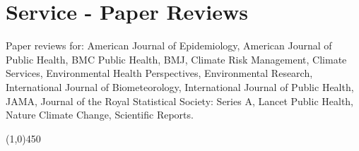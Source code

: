 \section*{Service - Paper Reviews}

\noindent Paper reviews for: American Journal of Epidemiology, American Journal of Public Health, BMC Public Health, BMJ, Climate Risk Management, Climate Services, Environmental Health Perspectives, Environmental Research, International Journal of Biometeorology, International Journal of Public Health, JAMA, Journal of the Royal Statistical Society: Series A, Lancet Public Health, Nature Climate Change, Scientific Reports.

\begin{center} \line(1,0){450} \end{center}